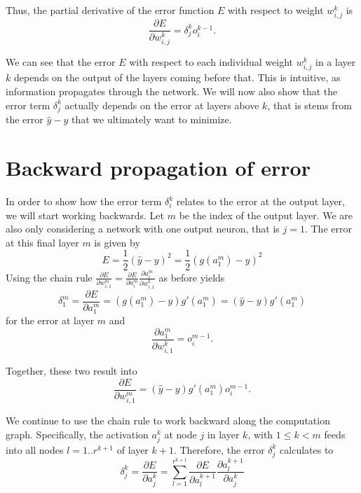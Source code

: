 Thus, the partial derivative of the error function $E$ with respect to weight $w_{i,j}^k$ is
\begin{equation}
\frac{\partial E}{\partial w^k_{i,j}}=\delta^k_jo^{k-1}_i.
\end{equation}

We can see that the error $E$ with respect to each individual weight $w_{i,j}^k$ in a layer $k$ depends on the output of the layers coming before that. This is intuitive, as information propagates through the network. We will now also show that the error term $\delta_j^k$ actually depends on the error at layers above $k$, that is stems from the error $\hat{y}-y$ that we ultimately want to minimize.

\section{Backward propagation of error}

In order to show how the error term $\delta^k_i$ relates to the error  at the output layer, we will start working backwards. Let $m$ be the index of the output layer. We are also only considering a network with one output neuron, that is $j=1$. The error at this final layer $m$ is given by
\begin{equation}
E=\frac{1}{2}(\hat{y}-y)^2=\frac{1}{2}(g(a_1^m)-y)^2
\end{equation}
Using the chain rule $\frac{\partial E}{\partial w_{i,1}^m}=\frac{\partial E}{\partial a^m_i}\frac{\partial a^m_i}{\partial w^k_{i,1}}$ as before yields
\begin{equation}
\delta^m_1=\frac{\partial E}{\partial a^m_1}=(g(a^m_1)-y)g'(a^m_1)=(\hat{y}-y)g'(a^m_1)
\end{equation}
for the error at layer $m$ and
\begin{equation}
\frac{\partial a^m_1}{\partial w^k_{i,1}}=o_i^{m-1}.
\end{equation}

Together, these two result into
\begin{equation}
\frac{\partial E}{\partial w_{i,1}^m}=(\hat{y}-y)g'(a^m_1)o_i^{m-1}.
\end{equation}

We continue to use the chain rule to work backward along the computation graph. Specifically, the activation $a^k_j$ at node $j$ in layer $k$, with $1\leq k <m$ feeds into all nodes $l=1..r^{k+1}$ of layer $k+1$. Therefore, the error $\delta^k_j$ calculates to
\begin{equation}
\delta^k_j=\frac{\partial E}{\partial a^k_j}=\sum_{l=1}^{r^{k+1}}\frac{\partial E}{\partial a_l^{k+1}}\frac{\partial a_l^{k+1}}{\partial a^k_j}
\end{equation}

